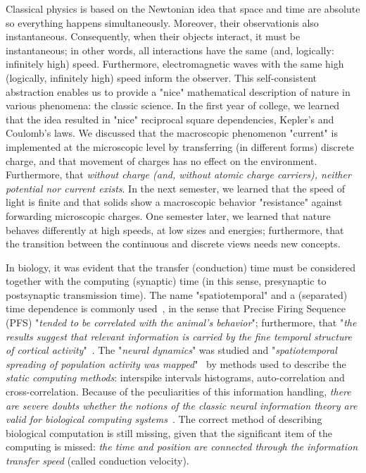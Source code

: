 {

Classical physics is based on the Newtonian idea that  space and time are absolute so everything happens simultaneously. Moreover, their observationis also instantaneous. Consequently, when their objects
interact, it must be instantaneous; in other words,
all interactions have the same (and, logically: infinitely high) speed. Furthermore, electromagnetic
waves with the same high (logically, infinitely high) speed inform the observer. This
self-consistent abstraction enables us to provide a "nice"
mathematical description of nature in various phenomena: the classic
science. In the first year of college, we learned that the idea resulted
in "nice" reciprocal square dependencies, Kepler's and Coulomb's
laws. We discussed that the macroscopic phenomenon "current" is
implemented at the microscopic level by transferring (in different
forms) discrete charge, and that movement of charges has no effect on the environment. Furthermore, that \textit{without charge (and, without atomic charge carriers),
neither potential nor current exists}. In the next semester, we learned
that the speed of light is finite and that solids show a macroscopic
behavior "resistance" against forwarding microscopic charges.
One semester later, we learned that nature behaves differently
at high speeds, at low sizes and energies;
furthermore, that the transition between the continuous and discrete 
views needs new concepts.

In biology, it was evident that
the transfer (conduction) time must be considered together with the computing (synaptic) time (in this sense, presynaptic to postsynaptic transmission time).  The name "\hypertarget{spatiotemporal}{spatiotemporal}"
and a (separated) time dependence is commonly used~\cite{PerturbationNeuralComputation:2002},
in the sense that  Precise Firing Sequence (PFS) "\textit{tended to be correlated with the animal's behavior}"; furthermore, that "\textit{the results suggest that relevant information is carried by the fine temporal structure of cortical activity}"~\cite{SpatiotemporalPrut:1998}.
The "\textit{neural dynamics}" was studied 
and "\textit{spatiotemporal spreading of population activity was mapped}"~\cite{SpatiotemporalPlenz:1996} by methods used to describe the \textit{static computing methods}: 
interspike intervals histograms, auto-correlation and cross-correlation.
Because of the peculiarities of this information handling, \textit{there are severe doubts whether 
the notions of the classic neural information theory are valid
for biological computing systems}~\cite{VeghNeuralShannon:2022}.
The correct method of describing biological computation is still missing, given that the significant item of the computing
is missed: \textit{the time and position are connected through the 
	information transfer speed} (called conduction velocity).
}
